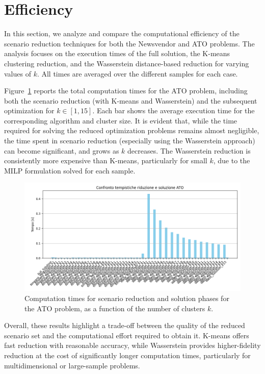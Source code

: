 \documentclass[a4paper,12pt]{article}
\begin{document}
	\newpage	
	\section{Efficiency}
	
	In this section, we analyze and compare the computational efficiency of the scenario reduction techniques for both the Newsvendor and ATO problems. The analysis focuses on the execution times of the full solution, the K-means clustering reduction, and the Wasserstein distance-based reduction for varying values of $k$. All times are averaged over the different samples for each case.
	
	Figure~\ref{fig:timing-ato} reports the total computation times for the ATO problem, including both the scenario reduction (with K-means and Wasserstein) and the subsequent optimization for $k \in [1,15]$. Each bar shows the average execution time for the corresponding algorithm and cluster size. It is evident that, while the time required for solving the reduced optimization problems remains almost negligible, the time spent in scenario reduction (especially using the Wasserstein approach) can become significant, and grows as $k$ decreases. The Wasserstein reduction is consistently more expensive than K-means, particularly for small $k$, due to the MILP formulation solved for each sample.
	
	\begin{figure}[H]
		\centering
		\includegraphics[width=1\textwidth]{../immagini/tempi_ato.png}
		\caption{Computation times for scenario reduction and solution phases for the ATO problem, as a function of the number of clusters $k$.}
		\label{fig:timing-ato}
	\end{figure}
	
	\vspace{0.5em}
	\noindent
	Overall, these results highlight a trade-off between the quality of the reduced scenario set and the computational effort required to obtain it. K-means offers fast reduction with reasonable accuracy, while Wasserstein provides higher-fidelity reduction at the cost of significantly longer computation times, particularly for multidimensional or large-sample problems.
	
\end{document}
